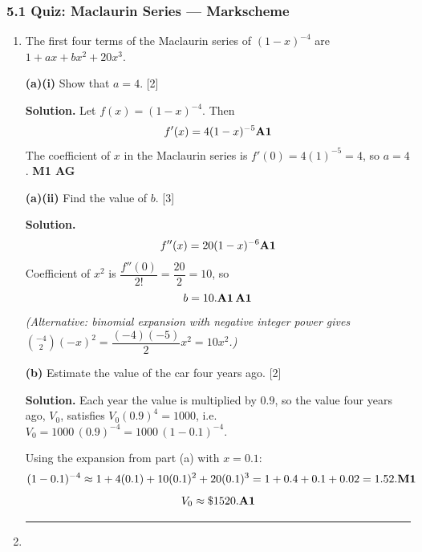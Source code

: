 \documentclass[12pt, twoside]{article}
\begin{document}
\subsubsection*{5.1 Quiz: Maclaurin Series --- Markscheme}

\begin{enumerate}[itemsep=0.3cm]

\item[1.] 

The first four terms of the Maclaurin series of $(1 - x)^{-4}$ are
$1 + ax + bx^2 + 20x^3$.

\textbf{(a)(i)} Show that $a = 4$. \hfill [2]

\textbf{Solution.} Let $f(x) = (1 - x)^{-4}$. Then
\[
f'(x) = 4(1 - x)^{-5} \hfill \textbf{A1}
\]
The coefficient of $x$ in the Maclaurin series is $f'(0) = 4(1)^{-5} = 4$,
so $a = 4$. \hfill \textbf{M1 AG}

\medskip

\textbf{(a)(ii)} Find the value of $b$. \hfill [3]

\textbf{Solution.}
\[
f''(x) = 20(1 - x)^{-6} \hfill \textbf{A1}
\]
Coefficient of $x^2$ is $\dfrac{f''(0)}{2!} = \dfrac{20}{2} = 10$, so
\[
b = 10. \hfill \textbf{A1\,A1}
\]
\textit{(Alternative: binomial expansion with negative integer power
gives $\binom{-4}{2}(-x)^2 = \dfrac{(-4)(-5)}{2}x^2 = 10x^2$.)}

\medskip

\textbf{(b)} Estimate the value of the car four years ago. \hfill [2]

\textbf{Solution.} Each year the value is multiplied by $0.9$, so the
value four years ago, $V_0$, satisfies $V_0 (0.9)^4 = 1000$, i.e.\
$V_0 = 1000\,(0.9)^{-4} = 1000\,(1 - 0.1)^{-4}$.

Using the expansion from part (a) with $x = 0.1$:
\[
(1 - 0.1)^{-4} \approx 1 + 4(0.1) + 10(0.1)^2 + 20(0.1)^3
= 1 + 0.4 + 0.1 + 0.02 = 1.52. \hfill \textbf{M1}
\]
\[
V_0 \approx \$1520. \hfill \textbf{A1}
\]

\bigskip
\hrule
\bigskip

\item[2.] 


\end{enumerate}
\end{document}
